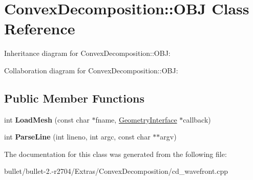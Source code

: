 \hypertarget{class_convex_decomposition_1_1_o_b_j}{\section{Convex\+Decomposition\+:\+:O\+B\+J Class Reference}
\label{class_convex_decomposition_1_1_o_b_j}
}


Inheritance diagram for Convex\+Decomposition\+:\+:O\+B\+J\+:


Collaboration diagram for Convex\+Decomposition\+:\+:O\+B\+J\+:
\subsection*{Public Member Functions}
\begin{DoxyCompactItemize}
\item 
\hypertarget{class_convex_decomposition_1_1_o_b_j_ab72774884717713b65109eacb9c0812e}{int {\bfseries Load\+Mesh} (const char $\ast$fname, \hyperlink{class_convex_decomposition_1_1_geometry_interface}{Geometry\+Interface} $\ast$callback)}\label{class_convex_decomposition_1_1_o_b_j_ab72774884717713b65109eacb9c0812e}

\item 
\hypertarget{class_convex_decomposition_1_1_o_b_j_a0f2e7b9f33ef6f855d1451df7ee916c7}{int {\bfseries Parse\+Line} (int lineno, int argc, const char $\ast$$\ast$argv)}\label{class_convex_decomposition_1_1_o_b_j_a0f2e7b9f33ef6f855d1451df7ee916c7}

\end{DoxyCompactItemize}


The documentation for this class was generated from the following file\+:\begin{DoxyCompactItemize}
\item 
bullet/bullet-\/2.-\/r2704/\+Extras/\+Convex\+Decomposition/cd\+\_\+wavefront.\+cpp\end{DoxyCompactItemize}

